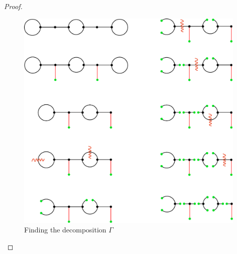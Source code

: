 \begin{proof}
\begin{figure}[h]
		\endlabellist
            \centering
		\includegraphics[width=11cm]{Chapter2/Figs/Graphs_Of_Pants}
		\caption{Finding the decomposition $\Gamma$}
		\label{fig:Gen}
	\end{figure}
	

\end{proof}
